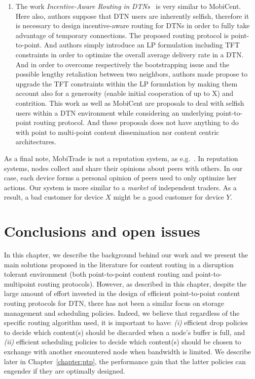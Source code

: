 \begin{enumerate}
\item The work \emph{Incentive-Aware Routing in DTNs}~\cite{IADTN} is very similar to MobiCent. Here also, authors suppose that DTN users are inherently selfish, therefore it is necessary to design incentive-aware routing for DTNs in order to fully take advantage of temporary connections. The proposed routing protocol is point-to-point. And authors simply introduce an LP formulation including TFT constraints in order to optimize the overall average delivery rate in a DTN. And in order to overcome respectively the bootstrapping issue and the possible lengthy retaliation between two neighbors, authors made propose to upgrade the TFT constraints within the LP formulation by making them account also for a generosity (enable initial cooperation of up to X) and contrition. This work as well as MobiCent are proposals to deal with selfish users within a DTN environment while considering an underlying point-to-point routing protocol. And these 
proposals does not have anything to do with point to multi-point content dissemination nor content centric architectures.

\end{enumerate}

As a final note, MobiTrade is not a reputation system, as e.g.~\cite{Reputation}. In reputation systems, nodes collect and share their opinions about peers with others. In our case, each device forms a personal opinion of peers used to only optimize her actions. Our system is more similar to a \emph{market} of independent traders. As a result, a bad customer for device $X$ might be a good customer for device $Y$.

\section{Conclusions and open issues}

In this chapter, we describe the background behind our work and we present the main solutions proposed in the literature for content routing in a disruption tolerant environment (both point-to-point content routing and point-to-multipoint routing protocols). However, as described in this chapter, despite the large amount of effort invested in the design of efficient point-to-point content routing protocols for DTN, there has not been a similar focus on storage management and scheduling policies. Indeed, we believe that regardless of the specific routing algorithm used, it is important to have: \emph{(i)} efficient drop policies to decide which content(s) should be discarded when a node's buffer is full, and \emph{(ii)} efficient scheduling policies to decide which content(s) should be chosen to exchange with another encountered node when bandwidth is limited. We describe later in Chapter~\ref{chapter:ptp}, the performance gain that the latter policies can engender if they are optimally designed. 

